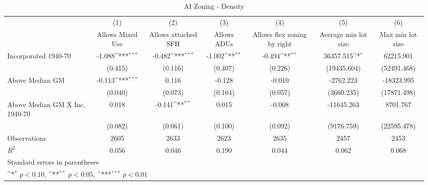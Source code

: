 \begin{table}[htbp]\centering
\def\sym#1{\ifmmode^{#1}\else\(^{#1}\)\fi}
\caption{AI Zoning - Density}
\begin{tabular}{l*{6}{c}}
\hline\hline
                    &\multicolumn{1}{c}{(1)}&\multicolumn{1}{c}{(2)}&\multicolumn{1}{c}{(3)}&\multicolumn{1}{c}{(4)}&\multicolumn{1}{c}{(5)}&\multicolumn{1}{c}{(6)}\\
                    &\multicolumn{1}{c}{Allows Mixed Use}&\multicolumn{1}{c}{Allows attached SFH}&\multicolumn{1}{c}{Allows ADUs}&\multicolumn{1}{c}{Allows flex zoning by right}&\multicolumn{1}{c}{Average min lot size}&\multicolumn{1}{c}{Max min lot size}\\
\hline
Incorporated 1940-70&      -1.088\sym{***}&      -0.482\sym{***}&      -1.002\sym{**} &      -0.494\sym{**} &   36357.515\sym{*}  &   62215.901         \\
                    &     (0.415)         &     (0.116)         &     (0.407)         &     (0.226)         & (19435.604)         & (52491.468)         \\
[1em]
Above Median GM     &      -0.113\sym{***}&       0.116         &      -0.128         &      -0.010         &   -2762.223         &  -18323.995         \\
                    &     (0.040)         &     (0.073)         &     (0.104)         &     (0.057)         &  (3660.235)         & (17871.498)         \\
[1em]
Above Median GM X Inc. 1940-70&       0.018         &      -0.141\sym{**} &       0.015         &      -0.008         &  -11645.263         &    8701.767         \\
                    &     (0.082)         &     (0.061)         &     (0.100)         &     (0.092)         &  (9176.759)         & (22595.478)         \\
\hline
Observations        &        2605         &        2633         &        2623         &        2635         &        2457         &        2453         \\
\(R^{2}\)           &       0.056         &       0.046         &       0.190         &       0.044         &       0.062         &       0.068         \\
\hline\hline
\multicolumn{7}{l}{\footnotesize Standard errors in parentheses}\\
\multicolumn{7}{l}{\footnotesize \sym{*} \(p<0.10\), \sym{**} \(p<0.05\), \sym{***} \(p<0.01\)}\\
\end{tabular}
\end{table}
